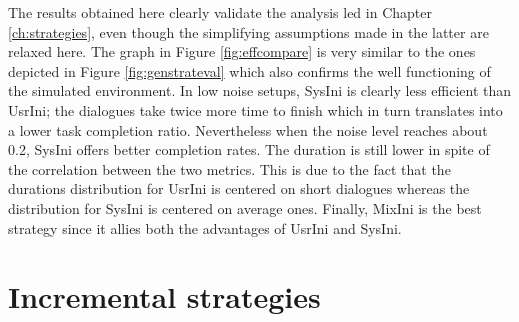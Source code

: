        The results obtained here clearly validate the analysis led in Chapter \ref{ch:strategies}, even though the simplifying assumptions made in the latter are relaxed here. The graph in Figure \ref{fig:effcompare} is very similar to the ones depicted in Figure \ref{fig:genstrateval} which also confirms the well functioning of the simulated environment. In low noise setups, SysIni is clearly less efficient than UsrIni; the dialogues take twice more time to finish which in turn translates into a lower task completion ratio. Nevertheless when the noise level reaches about 0.2, SysIni offers better completion rates. The duration is still lower in spite of the correlation between the two metrics. This is due to the fact that the durations distribution for UsrIni is centered on short dialogues whereas the distribution for SysIni is centered on average ones. Finally, MixIni is the best strategy since it allies both the advantages of UsrIni and SysIni.
        
\section{Incremental strategies}

    
		
